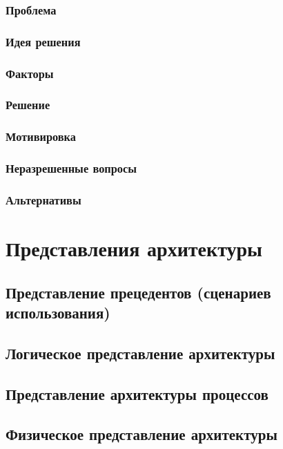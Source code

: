 \documentclass[a4paper,18pt]{article} %
\begin{document}
\subsubsection{\textbf{Проблема}}
\subsubsection{\textbf{Идея решения}}
\subsubsection{\textbf{Факторы}}
\subsubsection{\textbf{Решение}}
\subsubsection{\textbf{Мотивировка}}
\subsubsection{\textbf{Неразрешенные вопросы}}
\subsubsection{\textbf{Альтернативы}}


\newpage
\section{\textbf{Представления архитектуры}}
\subsection{\textbf{Представление прецедентов (сценариев использования)}}

\subsection{\textbf{Логическое представление архитектуры}}

\subsection{\textbf{Представление архитектуры процессов}}

\subsection{\textbf{Физическое представление архитектуры}}
\end{document}
